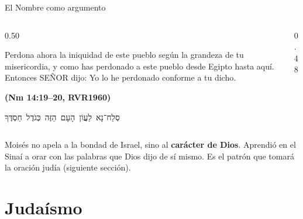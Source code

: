 \documentclass[hyperref={bookmarks=false},aspectratio=169]{beamer}
\newcommand{\heb}[1]{\mbox{\foreignlanguage{hebrew}{#1}}}
\newcommand{\SENOR}{S{\fontsize{0.78em}{1em}\selectfont EÑOR}}
\newcommand{\fuente}[1]{\par\hfill{\upshape\bfseries\footnotesize\textcolor{azul}{#1}}}
\newcommand{\destacar}[1]{\textbf{\textcolor{azul}{#1}}}
\begin{document}
\begin{frame}{El Nombre como argumento}
\begin{columns}[c,onlytextwidth]
\begin{column}{0.50\textwidth}
\begin{cita}Perdona ahora la iniquidad de este pueblo según la grandeza de tu misericordia, y como has perdonado a este pueblo desde Egipto hasta aquí. Entonces \SENOR{} dijo: Yo lo he perdonado conforme a tu dicho.\fuente{(Nm 14:19--20, RVR1960)}\end{cita}
\begin{center}\heb{סְלַח־נָא לַעֲוֹן הָעָם הַזֶּה כְּגֹדֶל חַסְדֶּךָ}\end{center}
\end{column}
\begin{column}{0.48\textwidth}
\centering
{}
\end{column}
\end{columns}\par\medskip
\small\RaggedRight Moisés no apela a la bondad de Israel, sino al \destacar{carácter de Dios}. Aprendió en el Sinaí a orar con las palabras que Dios dijo de sí mismo. Es el patrón que tomará la oración judía (siguiente sección).
\end{frame}

\section{Judaísmo}
\end{document}
